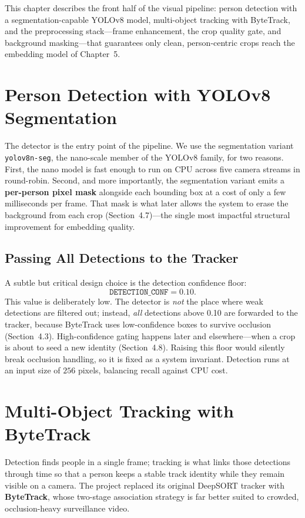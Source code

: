 \documentclass[12pt]{report}
\begin{document}
This chapter describes the front half of the visual pipeline: person detection with a segmentation-capable YOLOv8 model, multi-object tracking with ByteTrack, and the preprocessing stack---frame enhancement, the crop quality gate, and background masking---that guarantees only clean, person-centric crops reach the embedding model of Chapter~5.

\section{Person Detection with YOLOv8 Segmentation}
The detector is the entry point of the pipeline. We use the segmentation variant \texttt{yolov8n-seg}, the nano-scale member of the YOLOv8 family, for two reasons. First, the nano model is fast enough to run on CPU across five camera streams in round-robin. Second, and more importantly, the segmentation variant emits a \textbf{per-person pixel mask} alongside each bounding box at a cost of only a few milliseconds per frame. That mask is what later allows the system to erase the background from each crop (Section~4.7)---the single most impactful structural improvement for embedding quality.

\subsection{Passing All Detections to the Tracker}
A subtle but critical design choice is the detection confidence floor:
\[
\texttt{DETECTION\_CONF} = 0.10 .
\]
This value is deliberately low. The detector is \emph{not} the place where weak detections are filtered out; instead, \emph{all} detections above 0.10 are forwarded to the tracker, because ByteTrack uses low-confidence boxes to survive occlusion (Section~4.3). High-confidence gating happens later and elsewhere---when a crop is about to seed a new identity (Section~4.8). Raising this floor would silently break occlusion handling, so it is fixed as a system invariant. Detection runs at an input size of $256$ pixels, balancing recall against CPU cost.

\section{Multi-Object Tracking with ByteTrack}
Detection finds people in a single frame; tracking is what links those detections through time so that a person keeps a stable track identity while they remain visible on a camera. The project replaced its original DeepSORT tracker with \textbf{ByteTrack}, whose two-stage association strategy is far better suited to crowded, occlusion-heavy surveillance video.
\end{document}
